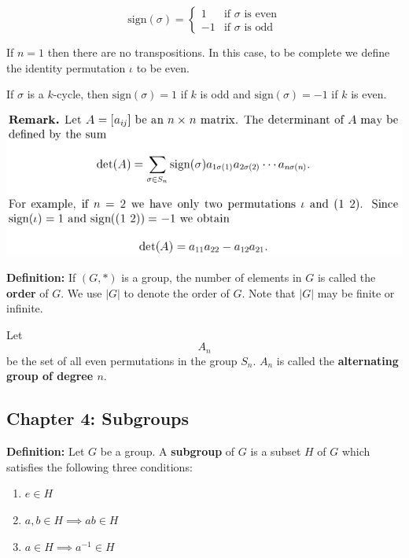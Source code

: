 \documentclass{article}
\begin{document}
\[
\text{sign}(\sigma) = \begin{cases} 
     1 & \text{if } \sigma \text{ is even} \\
     -1 & \text{if } \sigma \text{ is odd}
   \end{cases}
\]

If \(n = 1\) then there are no transpositions. In this case, to be complete we define the identity permutation \(\iota\) to be even.

If \(\sigma\) is a \(k\)-cycle, then \(\text{sign}(\sigma) = 1\) if \(k\) is odd and \(\text{sign}(\sigma) = -1\) if \(k\) is even.

\includegraphics[scale=0.45]{determinant}

\textbf{Definition:} If \((G, *)\) is a group, the number of elements in \(G\) is called the \textbf{order} of \(G\). We use \(|G|\) to denote the order of \(G\). Note that \(|G|\) may be finite or infinite.

Let \[A_n\] be the set of all even permutations in the group \(S_n\). \(A_n\) is called the \textbf{alternating group of degree \(n\)}.

\pagebreak
\subsection{Chapter 4: Subgroups}

\textbf{Definition:} Let \(G\) be a group. A \textbf{subgroup} of \(G\) is a subset \(H\) of \(G\) which satisfies the following three conditions:


\begin{enumerate}[1.]

\item \(e \in H\)

\item \(a, b \in H \implies ab \in H\)

\item \(a \in H \implies a^{-1} \in H\)

\end{enumerate}
\end{document}
